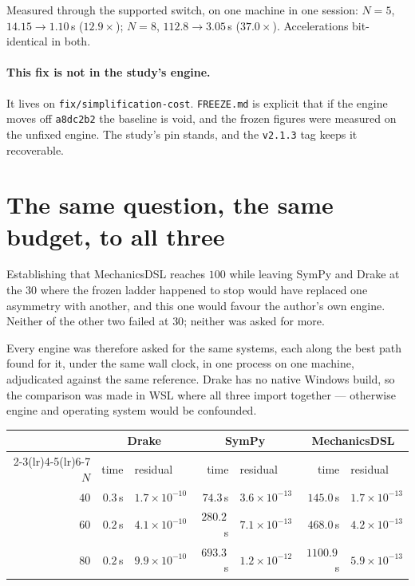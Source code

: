 \documentclass[11pt,a4paper]{article}
\newcommand{\code}[1]{\texttt{\small #1}}
\begin{document}
\noindent Measured through the supported switch, on one machine in one session:
$N=5$, $14.15\to1.10$\,s ($12.9\times$); $N=8$, $112.8\to3.05$\,s
($37.0\times$). Accelerations bit-identical in both.

\paragraph{This fix is not in the study's engine.}
It lives on \code{fix/simplification-cost}. \code{FREEZE.md} is explicit that if
the engine moves off \code{a8dc2b2} the baseline is void, and the frozen figures
were measured on the unfixed engine. The study's pin stands, and the \code{v2.1.3}
tag keeps it recoverable.

\section{The same question, the same budget, to all three}\label{sec:equal}

Establishing that MechanicsDSL reaches $100$ while leaving SymPy and Drake at
the $30$ where the frozen ladder happened to stop would have replaced one
asymmetry with another, and this one would favour the author's own engine.
Neither of the other two failed at $30$; neither was asked for more.

Every engine was therefore asked for the same systems, each along the best
path found for it, under the same wall clock, in one process on one machine,
adjudicated against the same reference. Drake has no native Windows build, so
the comparison was made in WSL where all three import together --- otherwise
engine and operating system would be confounded.

\begin{center}
\begin{tabular}{@{}rrlrlrl@{}}
\toprule
& \multicolumn{2}{c}{\textbf{Drake}} & \multicolumn{2}{c}{\textbf{SymPy}} & \multicolumn{2}{c}{\textbf{MechanicsDSL}} \\
\cmidrule(lr){2-3}\cmidrule(lr){4-5}\cmidrule(lr){6-7}
$N$ & time & residual & time & residual & time & residual \\
\midrule
$40$ & $0.3$\,s & $1.7\times10^{-10}$ & $74.3$\,s & $3.6\times10^{-13}$ & $145.0$\,s & $1.7\times10^{-13}$ \\
$60$ & $0.2$\,s & $4.1\times10^{-10}$ & $280.2$\,s & $7.1\times10^{-13}$ & $468.0$\,s & $4.2\times10^{-13}$ \\
$80$ & $0.2$\,s & $9.9\times10^{-10}$ & $693.3$\,s & $1.2\times10^{-12}$ & $1100.9$\,s & $5.9\times10^{-13}$ \\
\bottomrule
\end{tabular}
\end{center}
\end{document}
